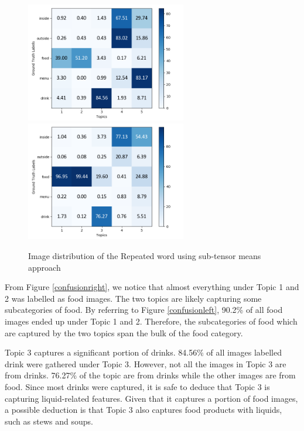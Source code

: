 \documentclass{article}
\begin{document}
\begin{figure}
\centering
{}
{%
    \includegraphics[width=7cm]{confusiona.png}
    \hspace{0.02\columnwidth}
}%
{%
    \includegraphics[width=7cm]{confusionb.png}
    \hspace*{\fill}
}%
\caption{Image distribution of the Repeated word using sub-tensor means approach} \label{img:confusion}
\end{figure}

From Figure \ref{confusionright}, we notice that almost everything under Topic 1 and 2 was labelled as food images. The two topics are likely capturing some subcategories of food. By referring to Figure \ref{confusionleft}, 90.2\% of all food images ended up under Topic 1 and 2. Therefore, the subcategories of food which are captured by the two topics span the bulk of the food category.

Topic 3 captures a significant portion of drinks. 84.56\% of all images labelled drink were gathered under Topic 3. However, not all the images in Topic 3 are from drinks. 76.27\% of the topic are from drinks while the other images are from food. Since most drinks were captured, it is safe to deduce that Topic 3 is capturing liquid-related features. Given that it captures a portion of food images, a possible deduction is that Topic 3 also captures food products with liquids, such as stews and soups.
\end{document}
